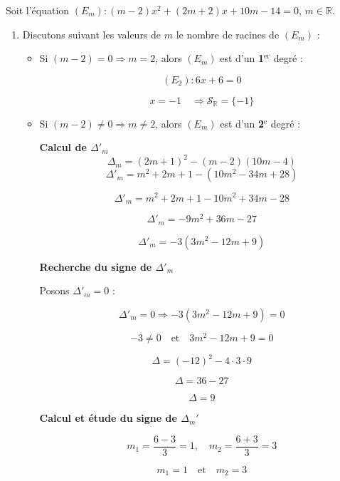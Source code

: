 \documentclass[12pt,a4paper]{article}
\begin{document}
Soit l’équation $(E_m) : (m - 2)x^2 + (2m + 2)x + 10m - 14 = 0$, $m \in \mathbb{R}$.
\begin{enumerate}
    \item Discutons suivant les valeurs de \(m\) le nombre de racines de \((E_m)\) :
    
    \begin{itemize}
        \item Si \((m-2) = 0 \Rightarrow m = 2\), alors \((E_m)\) est d'un \textbf{1\(^\text{er}\)} degré :
        
        \[
        (E_2) : 6x + 6 = 0
        \]
        
        \[
        x = -1 \quad \Rightarrow \mathcal{S}_\mathbb{R} = \{-1\}
        \]
        
        \item Si \((m-2) \neq 0 \Rightarrow m \neq 2\), alors \((E_m)\) est d'un \textbf{2\(^\text{e}\)} degré :
        
        \textbf{Calcul de \(\Delta'_m\)}
        \[
        \Delta_m = (2m+1)^2 - (m-2)(10m-4)
        \]
\[
\Delta'_m = m^2 + 2m + 1 - (10m^2 - 34m + 28)
\]

\[
\Delta'_m = m^2 + 2m + 1 - 10m^2 + 34m - 28
\]

\[
\Delta'_m = -9m^2 + 36m - 27
\]

\[
\Delta'_m = -3(3m^2 - 12m + 9)
\]

\textbf{Recherche du signe de \(\Delta'_m\)}

Posons \(\Delta'_m = 0\) :

\[
\Delta'_m = 0 \Rightarrow -3(3m^2 - 12m + 9) = 0
\]

\[
-3 \neq 0 \quad \text{et} \quad 3m^2 - 12m + 9 = 0
\]

\[
\Delta = (-12)^2 - 4 \cdot 3 \cdot 9
\]

\[
\Delta = 36 - 27
\]

\[
\Delta = 9
\]

\textbf{Calcul et étude du signe de \(\Delta_m'\)}

\[
m_1 = \frac{6 - 3}{3} = 1, \quad m_2 = \frac{6 + 3}{3} = 3
\]

\[
m_1 = 1 \quad \text{et} \quad m_2 = 3
\]



\end{itemize}
\end{enumerate}
\end{document}
